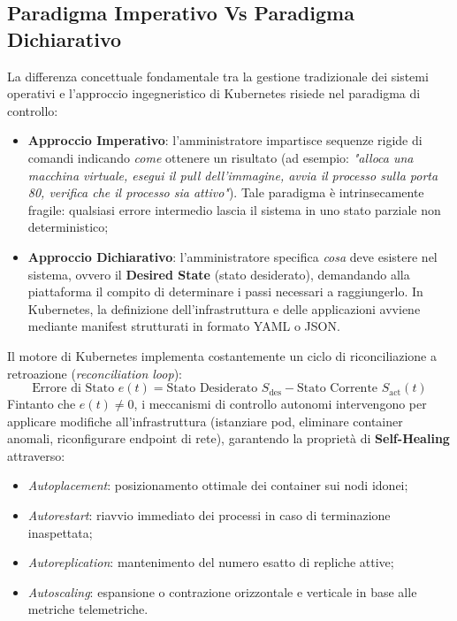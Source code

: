 \documentclass[11pt, a4paper]{article}
\begin{document}
\subsection{Paradigma Imperativo Vs Paradigma Dichiarativo}
La differenza concettuale fondamentale tra la gestione tradizionale dei sistemi operativi e l'approccio ingegneristico di Kubernetes risiede nel paradigma di controllo:
\begin{itemize}[noitemsep]
    \item \textbf{Approccio Imperativo}: l'amministratore impartisce sequenze rigide di comandi indicando \emph{come} ottenere un risultato (ad esempio: \emph{"alloca una macchina virtuale, esegui il pull dell'immagine, avvia il processo sulla porta 80, verifica che il processo sia attivo"}). Tale paradigma è intrinsecamente fragile: qualsiasi errore intermedio lascia il sistema in uno stato parziale non deterministico;
    \item \textbf{Approccio Dichiarativo}: l'amministratore specifica \emph{cosa} deve esistere nel sistema, ovvero il \textbf{Desired State} (stato desiderato), demandando alla piattaforma il compito di determinare i passi necessari a raggiungerlo. In Kubernetes, la definizione dell'infrastruttura e delle applicazioni avviene mediante manifest strutturati in formato YAML o JSON.
\end{itemize}

Il motore di Kubernetes implementa costantemente un ciclo di riconciliazione a retroazione (\emph{reconciliation loop}):
\[
\text{Errore di Stato } e(t) = \text{Stato Desiderato } S_{\text{des}} - \text{Stato Corrente } S_{\text{act}}(t)
\]
Fintanto che $e(t) \neq 0$, i meccanismi di controllo autonomi intervengono per applicare modifiche all'infrastruttura (istanziare pod, eliminare container anomali, riconfigurare endpoint di rete), garantendo la proprietà di \textbf{Self-Healing} attraverso:
\begin{itemize}[noitemsep]
    \item \emph{Autoplacement}: posizionamento ottimale dei container sui nodi idonei;
    \item \emph{Autorestart}: riavvio immediato dei processi in caso di terminazione inaspettata;
    \item \emph{Autoreplication}: mantenimento del numero esatto di repliche attive;
    \item \emph{Autoscaling}: espansione o contrazione orizzontale e verticale in base alle metriche telemetriche.
\end{itemize}
\end{document}
